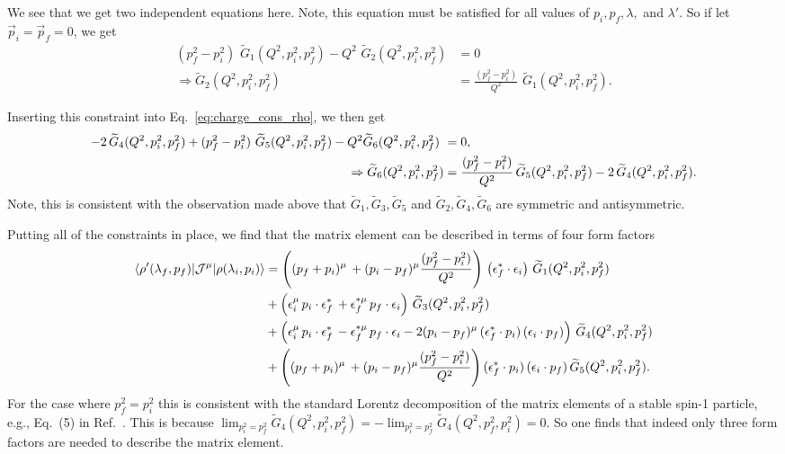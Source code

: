 We see that we get two independent equations here. Note, this equation must be satisfied for all values of $p_i,p_f,\lambda,$ and $\lambda'$. So if let $\vec{p}_i=\vec{p}_f=0$, we get 
\begin{align}
(p_f^2-p_i^2) \,\, \widetilde{G}_1(Q^2,p_i^2,p_f^2)
-Q^2 \,\,\widetilde{G}_2(Q^2,p_i^2,p_f^2)&=0
\\
\Rightarrow
\widetilde{G}_2(Q^2,p_i^2,p_f^2)&=
\frac{(p_f^2-p_i^2)}{Q^2} \,\, \widetilde{G}_1(Q^2,p_i^2,p_f^2).
\end{align}

Inserting this constraint into Eq.~\ref{eq:charge_cons_rho}, we then get
\begin{align}
-2
\,\widetilde{G}_4(Q^2,p_i^2,p_f^2)
+(p_f^2-p_i^2) \,\,\widetilde{G}_5(Q^2,p_i^2,p_f^2)
-Q^2\widetilde{G}_6(Q^2,p_i^2,p_f^2) \,\,
&=0,
\nonumber\\
\Rightarrow
\widetilde{G}_6(Q^2,p_i^2,p_f^2)&=\frac{(p_f^2-p_i^2)}{Q^2} \,\widetilde{G}_5(Q^2,p_i^2,p_f^2)-
2
\,\widetilde{G}_4(Q^2,p_i^2,p_f^2).
\end{align}
Note, this is consistent with the observation made above that $\widetilde{G}_1,\widetilde{G}_3,\widetilde{G}_5$ and $\widetilde{G}_2,\widetilde{G}_4,\widetilde{G}_6$ are symmetric and antisymmetric.

Putting all of the constraints in place, we find that the matrix element can be described in terms of four form factors
\begin{align}
\langle\rho'(\lambda_f,p_f)|{\mathcal{J}}^{\mu}|\rho(\lambda_i,p_i)\rangle
&=
\left((p_f+p_i)^\mu \,+(p_i-p_f)^\mu\frac{(p_f^2-p_i^2)}{Q^2} \right)\,\left(\epsilon_f^*\cdot \epsilon_i\right)\, \widetilde{G}_1(Q^2,p_i^2,p_f^2)\,
\nonumber\\&
+\left(\epsilon_i^\mu\, p_i \cdot \epsilon_f^*\,
+\epsilon_f^{*\mu}\, p_f\cdot \epsilon_i\right)\,\widetilde{G}_3(Q^2,p_i^2,p_f^2)\,
\nonumber\\
&+\left(\epsilon_i^\mu\, p_i\cdot \epsilon_f^*\,-\epsilon_f^{*\mu}\, p_f\cdot \epsilon_i
-2
(p_i-p_f)^\mu \,(\epsilon_f^*\cdot p_i)\,(\epsilon_i\cdot p_f)
\right)
\,\widetilde{G}_4(Q^2,p_i^2,p_f^2)
\nonumber\\&
+\left((p_f+p_i)^\mu \,+(p_i-p_f)^\mu\frac{(p_f^2-p_i^2)}{Q^2} \right)(\epsilon_f^*\cdot p_i)\,(\epsilon_i\cdot p_f)\,\widetilde{G}_5(Q^2,p_i^2,p_f^2).
\label{eq:rho_to_rho_FF}
\end{align}
{}
 For the case where $p_f^2=p_i^2$ this is consistent with the standard Lorentz decomposition of the matrix elements of a stable spin-1 particle, e.g., Eq.~(5) in Ref.~\cite{Shultz:2015pfa}. This is because $\lim_{p_i^2=p_f^2}\widetilde{G}_4(Q^2,p_i^2,p_f^2)=-\lim_{p_i^2=p_f^2}\widetilde{G}_4(Q^2,p_f^2,p_i^2)=0$. So one finds that indeed only three form factors are needed to describe the matrix element. 

